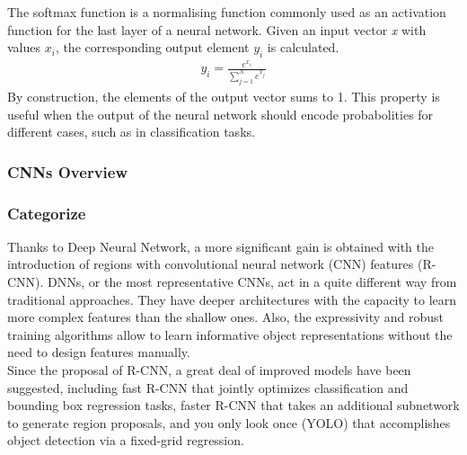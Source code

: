 \begin{enumerate}
                    \vspace{3mm}
                    The softmax function is a normalising function commonly used as an activation
                    function for the last layer of a neural network. Given an input vector \emph{x} 
                    with values \emph{$x_i$}, the corresponding output element \emph{$y_i$} is calculated.
                    \begin{align}
                        y_i = \frac{e^{x_i}}{\displaystyle\sum_{j=1}^N e^{x_j}}
                    \end{align}
                    By construction, the elements of the output vector sums to 1. This property is useful
                    when the output of the neural network should encode probabolities for different
                    cases, such as in classification tasks.
            \end{enumerate}

        \subsubsection{CNNs Overview}

        \subsubsection{Categorize}
            Thanks to Deep Neural Network, a more significant gain is obtained with the introduction of regions with convolutional neural network (CNN) features (R-CNN). DNNs, or the most representative CNNs, act in a quite different way from traditional approaches. They have deeper architectures with the capacity to learn more complex features than the shallow ones. Also, the expressivity and robust training algorithms allow to learn informative object representations without the need to design features manually. \\
            \vspace{3mm}
            Since the proposal of R-CNN, a great deal of improved models have been suggested, including fast R-CNN that jointly optimizes classification and bounding box regression tasks, faster R-CNN that takes an additional subnetwork to generate region proposals, and you only look once (YOLO) that accomplishes object detection via a fixed-grid regression. \\

